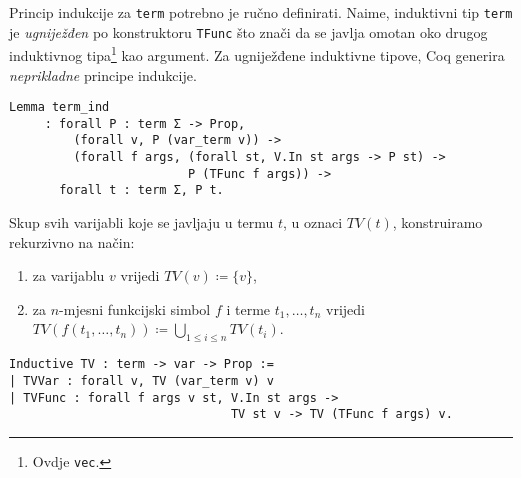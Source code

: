 \noindent Princip indukcije za \texttt{term} potrebno je ručno definirati.
Naime, induktivni tip \texttt{term} je \textit{ugniježđen} po konstruktoru \texttt{TFunc} što znači da se
javlja omotan oko drugog induktivnog tipa\footnote{Ovdje \texttt{vec}.} kao argument.
Za ugniježđene induktivne tipove, Coq generira \textit{neprikladne} principe indukcije.
\begin{verbatim}
Lemma term_ind
     : forall P : term Σ -> Prop,
         (forall v, P (var_term v)) ->
         (forall f args, (forall st, V.In st args -> P st) ->
                         P (TFunc f args)) ->
       forall t : term Σ, P t.
\end{verbatim}

\begin{definition}
  Skup svih varijabli koje se javljaju u termu \(t\), u oznaci \(\mathit{TV}(t)\), konstruiramo rekurzivno na način:
  \begin{enumerate}
  \item za varijablu \(v\) vrijedi \( \mathit{TV}(v) \coloneq \{ v \} \),
  \item za \(n\)-mjesni funkcijski simbol \(f\) i terme \(t_{1}, \ldots, t_{n}\) vrijedi \( \mathit{TV}(f(t_{1}, \ldots, t_{n})) \coloneq \bigcup_{1 \le i \le n} \mathit{TV}(t_{i}) \).
  \end{enumerate}
\begin{verbatim}
Inductive TV : term -> var -> Prop :=
| TVVar : forall v, TV (var_term v) v
| TVFunc : forall f args v st, V.In st args ->
                               TV st v -> TV (TFunc f args) v.
\end{verbatim}
\end{definition}

